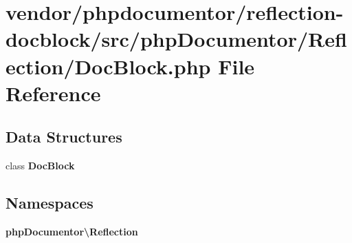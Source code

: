 \section{vendor/phpdocumentor/reflection-\/docblock/src/php\+Documentor/\+Reflection/\+Doc\+Block.php File Reference}
\label{phpdocumentor_2reflection-docblock_2src_2php_documentor_2_reflection_2_doc_block_8php}
\subsection*{Data Structures}
\begin{DoxyCompactItemize}
\item 
class {\bf Doc\+Block}
\end{DoxyCompactItemize}
\subsection*{Namespaces}
\begin{DoxyCompactItemize}
\item 
 {\bf php\+Documentor\textbackslash{}\+Reflection}
\end{DoxyCompactItemize}
